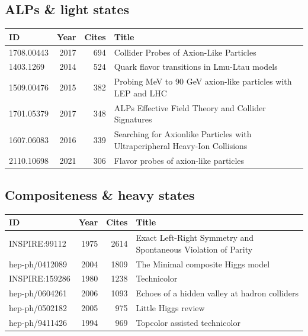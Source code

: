 \documentclass[11pt,a4paper]{article}
\begin{document}
\subsection*{ALPs \& light states}
\begin{center}\footnotesize\begin{tabular}{@{}p{2.5cm}rr p{9cm}@{}}\toprule ID & Year & Cites & Title\\\midrule
1708.00443 & 2017 & 694 & Collider Probes of Axion-Like Particles\\
1403.1269 & 2014 & 524 & Quark flavor transitions in Lmu-Ltau models\\
1509.00476 & 2015 & 382 & Probing MeV to 90 GeV axion-like particles with LEP and LHC\\
1701.05379 & 2017 & 348 & ALPs Effective Field Theory and Collider Signatures\\
1607.06083 & 2016 & 339 & Searching for Axionlike Particles with Ultraperipheral Heavy-Ion Collisions\\
2110.10698 & 2021 & 306 & Flavor probes of axion-like particles\\
\bottomrule\end{tabular}\end{center}
\subsection*{Compositeness \& heavy states}
\begin{center}\footnotesize\begin{tabular}{@{}p{2.5cm}rr p{9cm}@{}}\toprule ID & Year & Cites & Title\\\midrule
INSPIRE:99112 & 1975 & 2614 & Exact Left-Right Symmetry and Spontaneous Violation of Parity\\
hep-ph/0412089 & 2004 & 1809 & The Minimal composite Higgs model\\
INSPIRE:159286 & 1980 & 1238 & Technicolor\\
hep-ph/0604261 & 2006 & 1093 & Echoes of a hidden valley at hadron colliders\\
hep-ph/0502182 & 2005 & 975 & Little Higgs review\\
hep-ph/9411426 & 1994 & 969 & Topcolor assisted technicolor\\
\bottomrule\end{tabular}\end{center}
\end{document}
